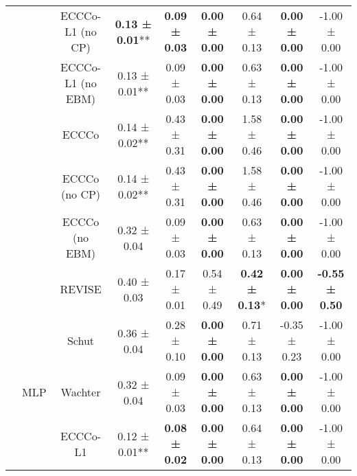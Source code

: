 \begin{longtable}[t]{ccccccccc}
 &  & ECCCo-L1 (no CP) & \textbf{0.13 ± 0.01}** & \textbf{0.09 ± 0.03}\hphantom{*}\hphantom{*} & \textbf{0.00 ± 0.00}\hphantom{*}\hphantom{*} & 0.64 ± 0.13\hphantom{*}\hphantom{*} & \textbf{0.00 ± 0.00}\hphantom{*}\hphantom{*} & -1.00 ± 0.00\hphantom{*}\hphantom{*}\\

 &  & ECCCo-L1 (no EBM) & 0.13 ± 0.01** & 0.09 ± 0.03\hphantom{*}\hphantom{*} & \textbf{0.00 ± 0.00}\hphantom{*}\hphantom{*} & 0.63 ± 0.13\hphantom{*}\hphantom{*} & \textbf{0.00 ± 0.00}\hphantom{*}\hphantom{*} & -1.00 ± 0.00\hphantom{*}\hphantom{*}\\

 &  & ECCCo & 0.14 ± 0.02** & 0.43 ± 0.31\hphantom{*}\hphantom{*} & \textbf{0.00 ± 0.00}\hphantom{*}\hphantom{*} & 1.58 ± 0.46\hphantom{*}\hphantom{*} & \textbf{0.00 ± 0.00}\hphantom{*}\hphantom{*} & -1.00 ± 0.00\hphantom{*}\hphantom{*}\\

 &  & ECCCo (no CP) & 0.14 ± 0.02** & 0.43 ± 0.31\hphantom{*}\hphantom{*} & \textbf{0.00 ± 0.00}\hphantom{*}\hphantom{*} & 1.58 ± 0.46\hphantom{*}\hphantom{*} & \textbf{0.00 ± 0.00}\hphantom{*}\hphantom{*} & -1.00 ± 0.00\hphantom{*}\hphantom{*}\\

 &  & ECCCo (no EBM) & 0.32 ± 0.04\hphantom{*}\hphantom{*} & 0.09 ± 0.03\hphantom{*}\hphantom{*} & \textbf{0.00 ± 0.00}\hphantom{*}\hphantom{*} & 0.63 ± 0.13\hphantom{*}\hphantom{*} & \textbf{0.00 ± 0.00}\hphantom{*}\hphantom{*} & -1.00 ± 0.00\hphantom{*}\hphantom{*}\\

 &  & REVISE & 0.40 ± 0.03\hphantom{*}\hphantom{*} & 0.17 ± 0.01\hphantom{*}\hphantom{*} & 0.54 ± 0.49\hphantom{*}\hphantom{*} & \textbf{0.42 ± 0.13}*\hphantom{*} & \textbf{0.00 ± 0.00}\hphantom{*}\hphantom{*} & \textbf{-0.55 ± 0.50}\hphantom{*}\hphantom{*}\\

 &  & Schut & 0.36 ± 0.04\hphantom{*}\hphantom{*} & 0.28 ± 0.10\hphantom{*}\hphantom{*} & \textbf{0.00 ± 0.00}\hphantom{*}\hphantom{*} & 0.71 ± 0.13\hphantom{*}\hphantom{*} & -0.35 ± 0.23\hphantom{*}\hphantom{*} & -1.00 ± 0.00\hphantom{*}\hphantom{*}\\

 & \multirow[t]{-9}{*}{\centering\arraybackslash MLP} & Wachter & 0.32 ± 0.04\hphantom{*}\hphantom{*} & 0.09 ± 0.03\hphantom{*}\hphantom{*} & \textbf{0.00 ± 0.00}\hphantom{*}\hphantom{*} & 0.63 ± 0.13\hphantom{*}\hphantom{*} & \textbf{0.00 ± 0.00}\hphantom{*}\hphantom{*} & -1.00 ± 0.00\hphantom{*}\hphantom{*}\\
\cmidrule{2-9}
 &  & ECCCo-L1 & 0.12 ± 0.01** & \textbf{0.08 ± 0.02}\hphantom{*}\hphantom{*} & \textbf{0.00 ± 0.00}\hphantom{*}\hphantom{*} & 0.64 ± 0.13\hphantom{*}\hphantom{*} & \textbf{0.00 ± 0.00}\hphantom{*}\hphantom{*} & -1.00 ± 0.00\hphantom{*}\hphantom{*}\\


\end{longtable}

